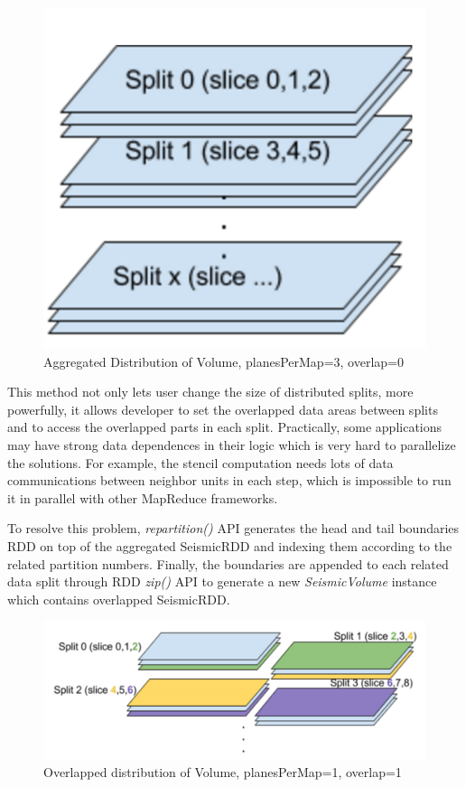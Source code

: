 \begin{figure}[h]
\centering
\includegraphics[scale=0.6]{figures/Aggregation.png}
\caption{Aggregated Distribution of Volume, planesPerMap=3, overlap=0}
\label{Aggregation}
\end{figure}

This method not only lets user change the size of distributed splits, more powerfully, it allows developer to set the overlapped data areas between splits and to access the overlapped parts in each split. Practically, some applications may have strong data dependences in their logic which is very hard to parallelize the solutions. For example, the stencil computation needs lots of data communications between neighbor units in each step, which is impossible to run it in parallel with other MapReduce frameworks. 

To resolve this problem, \emph{repartition()} API generates the head and tail boundaries RDD on top of the aggregated SeismicRDD and indexing them according to the related partition numbers. Finally, the boundaries are appended to each related data split through RDD \emph{zip()} API to generate a new \emph{SeismicVolume} instance which contains overlapped SeismicRDD. 

\begin{figure}[h]
\centering
\includegraphics[scale=0.5]{figures/Overlap.png}
\caption{Overlapped distribution of Volume, planesPerMap=1, overlap=1}
\label{Overlap}
\end{figure}

